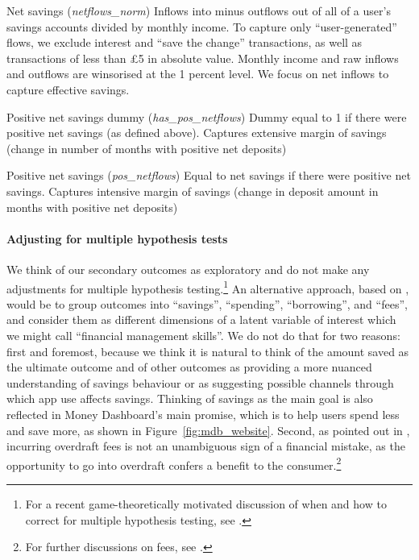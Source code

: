 Net savings (\textit{netflows\_norm})
Inflows into minus outflows out of all of a user's savings accounts divided
by monthly income. To capture only ``user-generated'' flows, we exclude
interest and ``save the change'' transactions, as well as transactions of
less than \pounds5 in absolute
value. Monthly income and raw inflows and outflows are winsorised at the 1
percent level.
We focus on net inflows to capture effective savings.

Positive net savings dummy (\textit{has\_pos\_netflows})
Dummy equal to 1 if there were positive net savings (as defined above).
Captures extensive margin of savings (change in number of months with positive
net deposits)

Positive net savings (\textit{pos\_netflows})
Equal to net savings if there were positive net savings.
Captures intensive margin of savings (change in deposit amount in months with
positive net deposits)




\paragraph{Adjusting for multiple hypothesis tests}%
\label{par:adjusting_for_multiple_hypothesis_tests}
We think of our secondary outcomes as exploratory and do not make any
adjustments for multiple hypothesis testing.\footnote{For a recent
game-theoretically motivated discussion of when and how to correct for multiple
hypothesis testing, see \citet{viviano2021should}.} An alternative approach,
based on \citet{anderson2008multiple}, would be to group outcomes into
``savings'', ``spending'', ``borrowing'', and ``fees'', and consider them as
different dimensions of a latent variable of interest which we might call
``financial management skills''. We do not do that for two reasons: first and
foremost, because we think it is natural to think of the amount saved as the
ultimate outcome and of other outcomes as providing a more nuanced
understanding of savings behaviour or as suggesting possible channels through
which app use affects savings. Thinking of savings as the main goal is also
reflected in Money Dashboard's main promise, which is to help users spend less
and save more, as shown in Figure~\ref{fig:mdb_website}. Second, as pointed out
in \citet{carlin2017fintech}, incurring overdraft fees is not an unambiguous
sign of a financial mistake, as the opportunity to go into overdraft confers a
benefit to the consumer.\footnote{For further discussions on fees, see
\citet{jorring2020financial, stango2009consumers}.}


